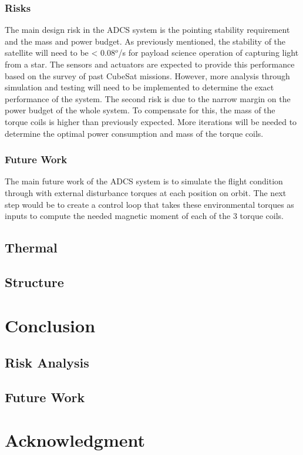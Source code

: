 \documentclass[12pt]{article}
\begin{document}
			\subsubsection{Risks}
			The main design risk in the ADCS system is the pointing stability requirement and the mass and power budget. As previously mentioned, the stability of the satellite will need to be < 0.08$^o$/s for payload science operation of capturing light from a star. The sensors and actuators are expected to provide this performance based on the survey of past CubeSat missions. However, more analysis through simulation and testing will need to be implemented to determine the exact performance of the system. The second risk is due to the narrow margin on the power budget of the whole system. To compensate for this, the mass of the torque coils is higher than previously expected. More iterations will be needed to determine the optimal power consumption and mass of the torque coils. 
			\subsubsection{Future Work}
			The main future work of the ADCS system is to simulate the flight condition through with external disturbance torques at each position on orbit. The next step would be to create a control loop that takes these environmental torques as inputs to compute the needed magnetic moment of each of the 3 torque coils. 
		\subsection{Thermal}
		\subsection{Structure}
\section{Conclusion}
		\subsection{Risk Analysis}
		\subsection{Future Work}
\section{Acknowledgment}
	
\end{document}
